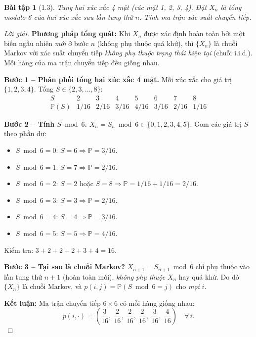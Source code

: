 \documentclass[8pt,a4paper]{article}
\newtheorem{exercise}{Bài tập}
\newenvironment{solution}{\begin{proof}[Lời giải]}{\end{proof}}
\newcommand{\prob}{\mathbb{P}}
\begin{document}
\begin{exercise}[1.3]
Tung hai xúc xắc 4 mặt (các mặt 1, 2, 3, 4). Đặt $X_n$ là tổng modulo 6 của hai xúc xắc sau lần tung thứ $n$. Tính ma trận xác suất chuyển tiếp.
\end{exercise}
\begin{solution}
\textbf{Phương pháp tổng quát:} Khi $X_n$ được xác định hoàn toàn bởi một biến ngẫu nhiên \emph{mới} ở bước $n$ (không phụ thuộc quá khứ), thì $\{X_n\}$ là chuỗi Markov với xác suất chuyển tiếp \emph{không phụ thuộc trạng thái hiện tại} (chuỗi i.i.d.). Mỗi hàng của ma trận chuyển tiếp đều giống nhau.

\textbf{Bước 1 -- Phân phối tổng hai xúc xắc 4 mặt.}
Mỗi xúc xắc cho giá trị $\{1,2,3,4\}$. Tổng $S \in \{2,3,\ldots,8\}$:
\[
\begin{array}{c|ccccccc}
S & 2 & 3 & 4 & 5 & 6 & 7 & 8 \\ \hline
\prob(S) & 1/16 & 2/16 & 3/16 & 4/16 & 3/16 & 2/16 & 1/16
\end{array}
\]

\textbf{Bước 2 -- Tính $S \bmod 6$.}
$X_n = S_n \bmod 6 \in \{0,1,2,3,4,5\}$. Gom các giá trị $S$ theo phần dư:
\begin{itemize}
  \item $S \bmod 6 = 0$: $S = 6 \Rightarrow \prob = 3/16$.
  \item $S \bmod 6 = 1$: $S = 7 \Rightarrow \prob = 2/16$.
  \item $S \bmod 6 = 2$: $S = 2$ hoặc $S = 8 \Rightarrow \prob = 1/16 + 1/16 = 2/16$.
  \item $S \bmod 6 = 3$: $S = 3 \Rightarrow \prob = 2/16$.
  \item $S \bmod 6 = 4$: $S = 4 \Rightarrow \prob = 3/16$.
  \item $S \bmod 6 = 5$: $S = 5 \Rightarrow \prob = 4/16$.
\end{itemize}
Kiểm tra: $3+2+2+2+3+4 = 16$. \checkmark

\textbf{Bước 3 -- Tại sao là chuỗi Markov?}
$X_{n+1} = S_{n+1} \bmod 6$ chỉ phụ thuộc vào lần tung thứ $n+1$ (hoàn toàn mới), \emph{không phụ thuộc} $X_n$ hay quá khứ. Do đó $\{X_n\}$ là chuỗi Markov, và $p(i,j) = \prob(S \bmod 6 = j)$ cho \emph{mọi} $i$.

\textbf{Kết luận:} Ma trận chuyển tiếp $6\times 6$ có mỗi hàng giống nhau:
\[
  p(i, \cdot) = \left(\frac{3}{16},\ \frac{2}{16},\ \frac{2}{16},\ \frac{2}{16},\ \frac{3}{16},\ \frac{4}{16}\right) \quad \forall\, i.
\]
\end{solution}
\end{document}

